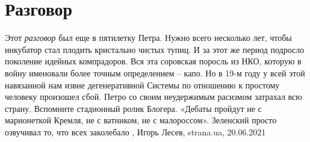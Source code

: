  
 
 
 
 
\chapter{Разговор}

Этот \emph{разговор} был еще в пятилетку Петра. Нужно всего несколько лет,
чтобы инкубатор стал плодить кристально чистых тупиц. И за этот же период
подросло поколение идейных компрадоров. Вся эта соровская поросль из НКО,
которую в войну именовали более точным определением – капо.  Но в 19-м году у
всей этой навязанной нам извне дегенеративной Системы по отношению к простому
человеку произошел сбой. Петро со своим неудержимым расизмом затрахал всю
страну.  Вспомните стадионный ролик Блогера. «Дебаты пройдут не с марионеткой
Кремля, не с ватником, не с малороссом». Зеленский просто озвучивал то, что
всех заколебало
, 
Игорь Лесев, strana.ua, 20.06.2021


